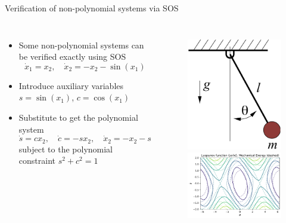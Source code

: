 \documentclass[aspectratio=169]{beamer}
\begin{document}
\begin{frame}{Verification of non-polynomial systems via SOS
\href{https://colab.research.google.com/github/TobiaMarcucci/optimal_control_pisa/blob/master/demos/lyapunov_pendulum.ipynb}{}}
\begin{columns}
\begin{itemize}
\item
Some non-polynomial systems can be verified exactly using SOS\footnotemark
$$
\dot x_1 = x_2, \quad
\dot x_2 = - x_2 - \sin(x_1)
$$
\item<2->
Introduce auxiliary variables $s = \sin(x_1)$, $c = \cos(x_1)$
\item<3->
Substitute to get the polynomial system
$$
\dot s = c x_2, \quad
\dot c = - s x_2, \quad
\dot x_2 = - x_2 - s
$$
subject to the polynomial constraint $s^2 + c^2 = 1$
\end{itemize}
\begin{figure}[h]
\includegraphics[width=.5\columnwidth]{figures/simple_pend.png} \\
\includegraphics[width=\columnwidth]{figures/lyapunov_pendulum.pdf}
\end{figure}
\end{columns}
\end{frame}
\end{document}
